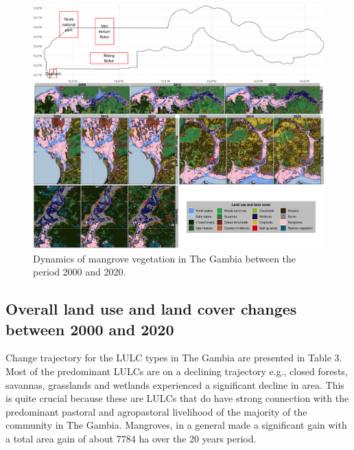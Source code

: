 \documentclass[utf8]{frontiersSCNS}
\begin{document}
\begin{figure}
\includegraphics[width=1\linewidth]{figures/Gambia_classifications_slices_2} \caption{Dynamics of mangrove vegetation in The Gambia between the period 2000 and 2020.}\label{fig:fig4}
\end{figure}

\hypertarget{ref42}{%
\subsection{Overall land use and land cover changes between 2000 and
2020}\label{ref42}}

Change trajectory for the LULC types in The Gambia are presented in
Table 3. Most of the predominant LULCs are on a declining trajectory
e.g., closed forests, savannas, grasslands and wetlands experienced a
significant decline in area. This is quite crucial because these are
LULCs that do have strong connection with the predominant pastoral and
agropastoral livelihood of the majority of the community in The Gambia.
Mangroves, in a general made a significant gain with a total area gain
of about 7784 ha over the 20 years period.
\end{document}
